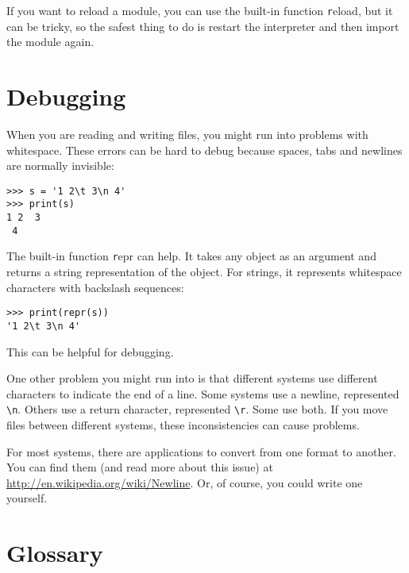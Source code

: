 \documentclass[
DIV=11,
fontsize=12,
twoside,
headinclude=false,
titlepage=firstiscover,
abstract=true,
headsepline=true,
footsepline=true,
chapterprefix=true, %
headings=big,
bibliography=totoc,%
captions=tableheading
]{scrbook}
\theoremstyle{definition}
\begin{document}
If you want to reload a module, you can use the built-in function 
{\texttt reload}, but it can be tricky, so the safest thing to do is
restart the interpreter and then import the module again.


\section{Debugging}

When you are reading and writing files, you might run into problems
with whitespace.  These errors can be hard to debug because spaces,
tabs and newlines are normally invisible:

\begin{lstlisting}
>>> s = '1 2\t 3\n 4'
>>> print(s)
1 2	 3
 4
\end{lstlisting}

The built-in function {\texttt repr} can help.  It takes any object as an
argument and returns a string representation of the object.  For
strings, it represents whitespace
characters with backslash sequences:

\begin{lstlisting}
>>> print(repr(s))
'1 2\t 3\n 4'
\end{lstlisting}

This can be helpful for debugging.

One other problem you might run into is that different systems
use different characters to indicate the end of a line.  Some
systems use a newline, represented \verb"\n".  Others use
a return character, represented \verb"\r".  Some use both.
If you move files between different systems, these inconsistencies
can cause problems.

For most systems, there are applications to convert from one
format to another.  You can find them (and read more about this
issue) at \url{http://en.wikipedia.org/wiki/Newline}.  Or, of course, you
could write one yourself.


\section{Glossary}
\end{document}
